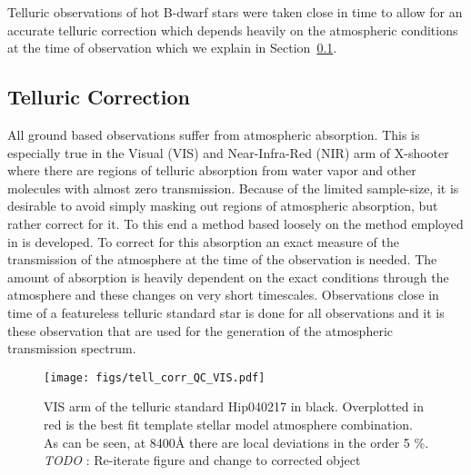 \documentclass{aa}    %
\newcommand{\figlabel}[1]{\label{fig:#1}}
\newcommand{\tablabel}[1]{\label{tab:#1}}
\newcommand{\sectionname}{Section}
\newcommand{\Sect}[1]{\sectionname~\ref{sect:#1}}
\newcommand{\sect}[1]{\Sect{#1}}
\newcommand{\sectlabel}[1]{\label{sect:#1}}
\newcommand{\todo}[3]{{\color{#2}\emph{#1}: #3}}
\newcommand{\jstodo}[1]{\todo{ \\TODO }{green}{#1}}
\begin{document}
Telluric observations of hot B-dwarf stars were taken close in time to allow for an accurate telluric correction which depends heavily on the atmospheric conditions at the time of observation which we explain in \sect{telluric}.



 \tablabel{targs}



\subsection{Telluric Correction}   \sectlabel{telluric}

All ground based observations suffer from atmospheric absorption. This is especially true in the Visual (VIS) and Near-Infra-Red (NIR) arm of X-shooter where there are regions of telluric absorption from water vapor and other molecules with almost zero transmission. Because of the limited sample-size, it is desirable to avoid simply masking out regions of atmospheric absorption, but rather correct for it. To this end a method based loosely on the method employed in \cite{Chen2014} is developed.
To correct for this absorption an exact measure of the transmission of the atmosphere at the time of the observation is needed. The amount of absorption is heavily dependent on the exact conditions through the atmosphere and these changes on very short timescales. Observations close in time of a featureless telluric standard star is done for all observations and it is these observation that are used for the generation of the atmospheric transmission spectrum. 

\begin{figure}[hbtp]
  \centering
  \texttt{[image: figs/tell\_corr\_QC\_VIS.pdf]}
  \caption[]{VIS arm of the telluric standard Hip040217 in black. Overplotted in red is the best fit template stellar model atmosphere combination. As can be seen, at 8400\r{A}  there are local deviations in the order 5 \%. \jstodo{Re-iterate figure and change to corrected object} }
\figlabel{telluric_qc}
\end{figure}
\end{document}
